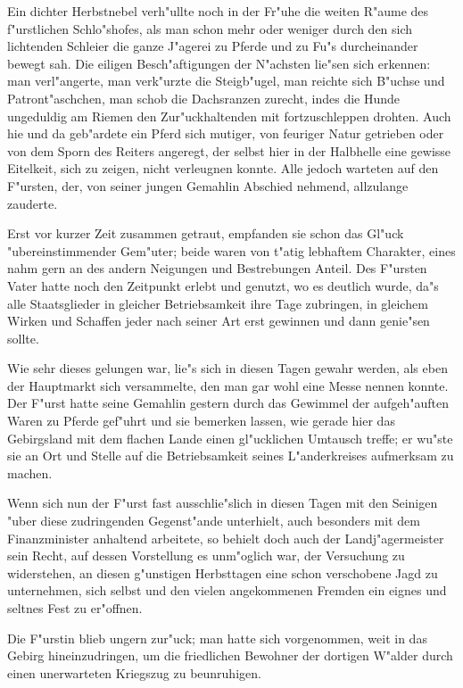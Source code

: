 \documentclass[ddc]{tudform}
\begin{document}
Ein dichter Herbstnebel verh"ullte noch in der Fr"uhe die weiten R"aume des
f"urstlichen Schlo"shofes, als man schon mehr oder weniger durch den sich
lichtenden Schleier die ganze J"agerei zu Pferde und zu Fu"s durcheinander
bewegt sah. Die eiligen Besch"aftigungen der N"achsten lie"sen sich erkennen:
man verl"angerte, man verk"urzte die Steigb"ugel, man reichte sich B"uchse
und Patront"aschchen, man schob die Dachsranzen zurecht, indes die Hunde
ungeduldig am Riemen den Zur"uckhaltenden mit fortzuschleppen drohten. Auch
hie und da geb"ardete ein Pferd sich mutiger, von feuriger Natur getrieben
oder von dem Sporn des Reiters angeregt, der selbst hier in der Halbhelle
eine gewisse Eitelkeit, sich zu zeigen, nicht verleugnen konnte. Alle jedoch
warteten auf den F"ursten, der, von seiner jungen Gemahlin Abschied nehmend,
allzulange zauderte.
    
Erst vor kurzer Zeit zusammen getraut, empfanden sie schon das Gl"uck
"ubereinstimmender Gem"uter; beide waren von t"atig lebhaftem Charakter, eines
nahm gern an des andern Neigungen und Bestrebungen Anteil. Des F"ursten Vater
hatte noch den Zeitpunkt erlebt und genutzt, wo es deutlich wurde, da"s alle
Staatsglieder in gleicher Betriebsamkeit ihre Tage zubringen, in gleichem
Wirken und Schaffen jeder nach seiner Art erst gewinnen und dann genie"sen 
sollte.

Wie sehr dieses gelungen war, lie"s sich in diesen Tagen gewahr werden, als eben
der Hauptmarkt sich versammelte, den man gar wohl eine Messe nennen konnte. Der
F"urst hatte seine Gemahlin gestern durch das Gewimmel der aufgeh"auften Waren 
zu
Pferde gef"uhrt und sie bemerken lassen, wie gerade hier das Gebirgsland mit dem
flachen Lande einen gl"ucklichen Umtausch treffe; er wu"ste sie an Ort und 
Stelle
auf die Betriebsamkeit seines L"anderkreises aufmerksam zu machen.

Wenn sich nun der F"urst fast ausschlie"slich in diesen Tagen mit den Seinigen 
"uber
diese zudringenden Gegenst"ande unterhielt, auch besonders mit dem 
Finanzminister
anhaltend arbeitete, so behielt doch auch der Landj"agermeister sein Recht, auf
dessen Vorstellung es unm"oglich war, der Versuchung zu widerstehen, an diesen
g"unstigen Herbsttagen eine schon verschobene Jagd zu unternehmen, sich selbst 
und
den vielen angekommenen Fremden ein eignes und seltnes Fest zu er"offnen.

Die F"urstin blieb ungern zur"uck; man hatte sich vorgenommen, weit in das 
Gebirg
hineinzudringen, um die friedlichen Bewohner der dortigen W"alder durch einen
unerwarteten Kriegszug zu beunruhigen.
\end{document}
